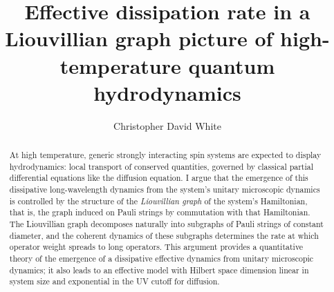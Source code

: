 \documentclass[aps,prb,nofootinbib,twocolumn,balancelastpage,amsmath,amssymb,floatfix,superscriptaddress,]{revtex4-1}
\newcommand{\todo}[1]{{\color{red}\footnotesize \textsc{todo} \textsf{\textsl{#1}}}}
\begin{document}
\title{Effective dissipation rate in a Liouvillian graph picture of high-temperature quantum hydrodynamics}%

\author{Christopher David White}

\begin{abstract}

  At high temperature, generic strongly interacting spin systems are expected to display hydrodynamics:
  local transport of conserved quantities,
  governed by classical partial differential equations like the diffusion equation.
  I argue that the emergence of this dissipative long-wavelength dynamics from the system's unitary microscopic dynamics 
  is controlled by the structure of the \textit{Liouvillian graph} of the system's Hamiltonian,
  that is, the graph induced on Pauli strings by commutation with that Hamiltonian.
  The Liouvillian graph decomposes naturally into subgraphs of Pauli strings of constant diameter,
  and the coherent dynamics of these subgraphs determines the rate at which operator weight spreads to long operators.
  This argument provides a quantitative theory of the emergence of a dissipative effective dynamics from unitary microscopic dynamics;
  it also leads to an effective model with Hilbert space dimension linear in system size and exponential in the UV cutoff for diffusion.

\end{abstract}
  
\end{document}

